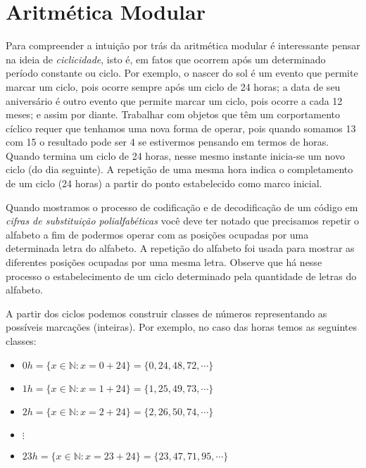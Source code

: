 \section{Aritm\'{e}tica Modular}

Para compreender a intui\c{c}\~{a}o por tr\'{a}s da aritm\'{e}tica modular \'{e} interessante pensar na ideia de \textit{ciclicidade}, 
isto \'{e}, em
fatos que ocorrem ap\'{o}s um determinado per\'{i}odo constante ou ciclo. Por exemplo, o nascer do sol \'{e} um evento que 
permite marcar um ciclo, pois ocorre sempre ap\'{o}s um ciclo de 24 horas; a data de seu anivers\'{a}rio \'{e} outro evento que permite marcar um ciclo, pois ocorre a cada 12 meses; e assim por diante. Trabalhar com objetos que t\^{e}m um corportamento c\'{i}clico requer que tenhamos uma nova forma de operar, pois quando somamos 13 com 15 o resultado pode ser 4 se estivermos pensando em termos de horas. Quando termina um ciclo de 24 horas, nesse mesmo instante inicia-se um novo ciclo (do dia seguinte). A repeti\c{c}\~{a}o de uma mesma hora indica o completamento de um ciclo (24 horas) a partir do ponto estabelecido como marco inicial. 

Quando mostramos o processo de codifica\c{c}\~{a}o e de decodifica\c{c}\~{a}o de um c\'{o}digo em 
\textit{cifras de substitui\c{c}\~{a}o polialfab\'{e}ticas} voc\^{e} deve ter notado que precisamos repetir o alfabeto 
a fim de podermos operar com as posi\c{c}\~{o}es ocupadas por uma determinada letra do alfabeto. A repeti\c{c}\~{a}o do alfabeto 
foi usada para mostrar as diferentes posi\c{c}\~{o}es ocupadas por uma mesma letra. Observe que h\'{a} nesse processo o 
estabelecimento de um ciclo determinado pela quantidade de letras do alfabeto.

A partir dos ciclos podemos construir classes de n\'{u}meros representando as poss\'{i}veis marca\c{c}\~{o}es (inteiras). Por exemplo,  
no caso das horas temos as seguintes classes:  

\begin{itemize}
	\item $0h=\{x\in\mathbb{N}: x=0+24\}=\{0, 24, 48, 72, \cdots\}$ 
	\item $1h=\{x\in\mathbb{N}: x=1+24\}=\{1, 25, 49, 73, \cdots\}$
	\item $2h=\{x\in\mathbb{N}: x=2+24\}=\{2, 26, 50, 74, \cdots\}$
	\item $\vdots$
	\item $23h=\{x\in\mathbb{N}: x=23+24\}=\{23, 47, 71, 95, \cdots\}$
\end{itemize}


